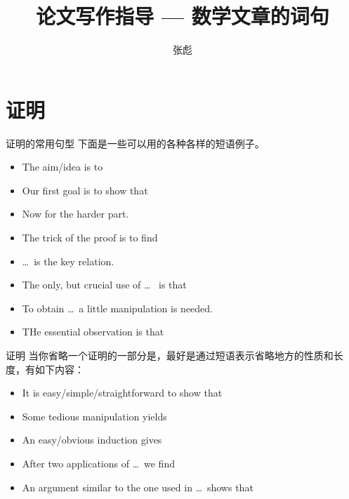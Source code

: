 \documentclass{ctexbeamer}
\begin{document}
\title[]{论文写作指导 --- 数学文章的词句}
\author[]{{\large 张彪} }

\date{}






\begin{frame}
\maketitle
\end{frame}


\begin{frame}
	\tableofcontents
\end{frame}



\section{证明}



\begin{frame}{证明的常用句型}
	下面是一些可以用的各种各样的短语例子。
	\begin{itemize}
		\item The aim/idea is to
		\item Our first goal is to show that
		\item Now for the harder part.
		\item The trick of the proof is to find
		\item \dots ~is the key relation.
		\item The only, but crucial use of  \dots~ is that
		\item To obtain \dots ~a little manipulation is needed.
		\item THe essential observation is that
	\end{itemize}
\end{frame}


\begin{frame}{证明}
	当你省略一个证明的一部分是，最好是通过短语表示省略地方的性质和长度，有如下内容：
	\begin{itemize}
		\item It is easy/simple/straightforward to show that
		\item Some tedious manipulation yields
		\item An easy/obvious induction gives
		\item After two applications of  \dots ~we find
		\item An argument similar to the one used in  \dots ~shows that
	\end{itemize}
\end{frame}
\end{document}
